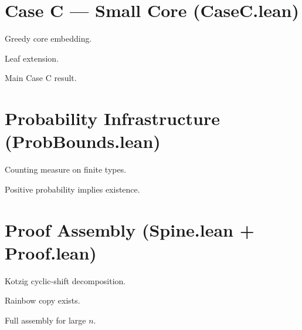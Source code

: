 \chapter{Case C --- Small Core (CaseC.lean)}
\begin{lemma}\label{lem:caseC_embed_core}
\leanok
Greedy core embedding.
\end{lemma}

\begin{lemma}\label{lem:caseC_extend_embedding}
Leaf extension.
\end{lemma}

\begin{theorem}\label{thm:caseC_rainbow}
Main Case C result.
\end{theorem}

\chapter{Probability Infrastructure (ProbBounds.lean)}
\begin{definition}\label{def:prob_event}
\leanok
Counting measure on finite types.
\end{definition}

\begin{lemma}\label{lem:exists_of_prob_gt_zero}
\leanok
Positive probability implies existence.
\end{lemma}

\chapter{Proof Assembly (Spine.lean + Proof.lean)}
\begin{theorem}\label{thm:decomp_of_rainbow_copy}
\leanok
Kotzig cyclic-shift decomposition.
\end{theorem}

\begin{theorem}\label{thm:rainbow_copy_exists}
Rainbow copy exists.
\end{theorem}

\begin{theorem}\label{thm:ringel_conjecture_large_via_spine}
Full assembly for large $n$.
\end{theorem}
